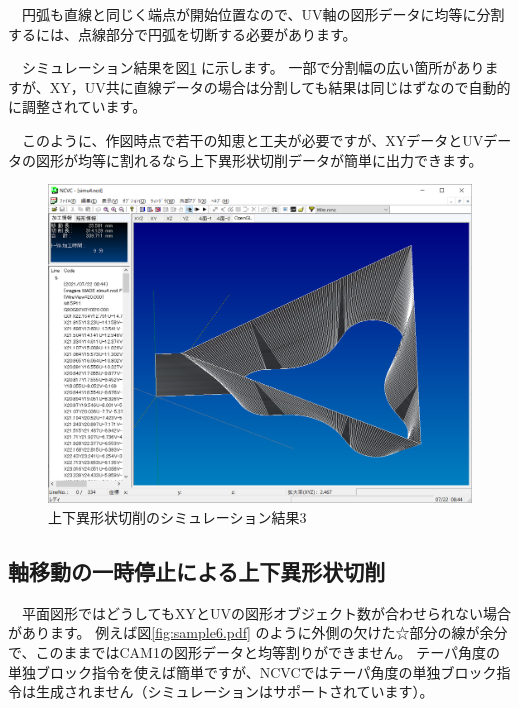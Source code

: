 　円弧も直線と同じく端点が開始位置なので、UV軸の図形データに均等に分割するには、点線部分で円弧を切断する必要があります。

　シミュレーション結果を図\ref{fig:simu4.png} に示します。
一部で分割幅の広い箇所がありますが、XY，UV共に直線データの場合は分割しても結果は同じはずなので自動的に調整されています。

　このように、作図時点で若干の知恵と工夫が必要ですが、XYデータとUVデータの図形が均等に割れるなら上下異形状切削データが簡単に出力できます。

\begin{figure}[H]
\centering
\includegraphics[scale=0.5]{No2/fig/simu4.png}
\caption{上下異形状切削のシミュレーション結果3}
\label{fig:simu4.png}
\end{figure}

\subsection{軸移動の一時停止による上下異形状切削}
　平面図形ではどうしてもXYとUVの図形オブジェクト数が合わせられない場合があります。
例えば図\ref{fig:sample6.pdf} のように外側の欠けた☆部分の線が余分で、このままではCAM1の図形データと均等割りができません。
テーパ角度の単独ブロック指令を使えば簡単ですが、NCVCではテーパ角度の単独ブロック指令は生成されません（シミュレーションはサポートされています）。

